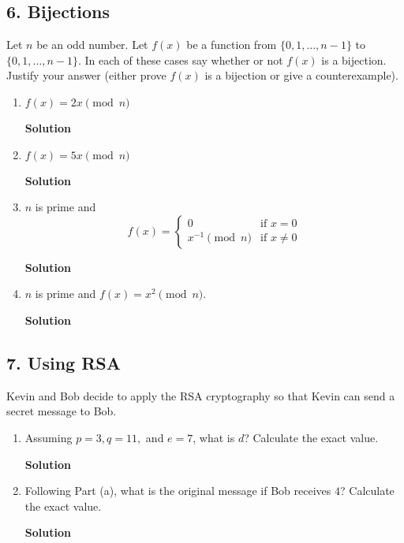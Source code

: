 \documentclass{article}\usepackage{amsmath,amssymb,amsthm,tikz,tkz-graph,color,chngpage,soul,hyperref,csquotes,graphicx,floatrow}\newcommand*{\QEDB}{\hfill\ensuremath{\square}}\newtheorem*{prop}{Proposition}\renewcommand{\theenumi}{\alph{enumi}}\usepackage[shortlabels]{enumitem}\usepackage[nobreak=true]{mdframed}\usetikzlibrary{matrix,calc}\MakeOuterQuote{"}\usepackage[margin=0.75in]{geometry}
\begin{document}
\subsection*{6. Bijections}
Let $n$ be an odd number. Let $f(x)$ be a function from $\{0,1,\ldots,n-1\}$ to $\{0,1,\ldots,n-1\}$. In each of these cases say whether or not $f(x)$ is a bijection. Justify your answer (either prove $f(x)$ is a bijection or give a counterexample).
\begin{enumerate}
\item $f(x)=2x\pmod n$
\begin{mdframed}
\textbf{Solution}

\end{mdframed}
\item $f(x)=5x\pmod n$
\begin{mdframed}
\textbf{Solution}

\end{mdframed}
\item $n$ is prime and $$f(x)=\begin{cases} 0 & \text{if }x= 0 \\ x^{-1}\pmod n & \text{if }x\ne 0 \end{cases}$$
\begin{mdframed}
\textbf{Solution}

\end{mdframed}
\item $n$ is prime and $f(x)=x^2\pmod n$.
\begin{mdframed}
\textbf{Solution}

\end{mdframed}
\end{enumerate}
\clearpage


\subsection*{7. Using RSA}
Kevin and Bob decide to apply the RSA cryptography so that Kevin can send a secret message to Bob.
\begin{enumerate}
\item Assuming $p=3,q=11,$ and $e=7$, what is $d$? Calculate the exact value.
\begin{mdframed}
\textbf{Solution}

\end{mdframed}
\item Following Part (a), what is the original message if Bob receives $4$? Calculate the exact value.
\begin{mdframed}
\textbf{Solution}

\end{mdframed}
\end{enumerate}
\clearpage
\end{document}
